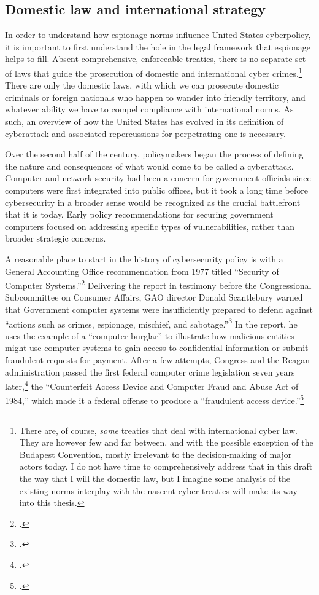 \documentclass{report}
\begin{document}
\begin{refsegment}
\subsection{Domestic law and international strategy}
In order to understand how espionage norms influence United States cyberpolicy, it is important to first understand the hole in the legal framework that espionage helps to fill. Absent comprehensive, enforceable treaties, there is no separate set of laws that guide the prosecution of domestic and international cyber crimes.\footnote{There are, of course, \emph{some} treaties that deal with international cyber law. They are however few and far between, and with the possible exception of the Budapest Convention, mostly irrelevant to the decision-making of major actors today. I do not have time to comprehensively address that in this draft the way that I will the domestic law, but I imagine some analysis of the existing norms interplay with the nascent cyber treaties will make its way into this thesis.} There are only the domestic laws, with which we can prosecute domestic criminals or foreign nationals who happen to wander into friendly territory, and whatever ability we have to compel compliance with international norms. As such, an overview of how the United States has evolved in its definition of cyberattack and associated repercussions for perpetrating one is necessary.

Over the second half of the  century, policymakers began the process of defining the nature and consequences of what would come to be called a cyberattack. Computer and network security had been a concern for government officials since computers were first integrated into public offices, but it took a long time before cybersecurity in a broader sense would be recognized as the crucial battlefront that it is today. Early policy recommendations for securing government computers focused on addressing specific types of vulnerabilities, rather than broader strategic concerns.

A reasonable place to start in the history of cybersecurity policy is with a General Accounting Office recommendation from 1977 titled ``Security of Computer Systems.''\footcite{washington_post_staff_timeline_2003} Delivering the report in testimony before the Congressional Subcommittee on Consumer Affairs, GAO director Donald Scantlebury warned that Government computer systems were insufficiently prepared to defend against ``actions such as crimes, espionage, mischief, and sabotage.''\footcite{u.s._government_accounting_office_security_1977} In the report, he uses the example of a ``computer burglar'' to illustrate how malicious entities might use computer systems to gain access to confidential information or submit fraudulent requests for payment. After a few attempts, Congress and the Reagan administration passed the first federal computer crime legislation seven years later,\footcite[This later bill, the Computer Security Act of 1987, describes the 1984 bill as being the first federal legislation in this area.]{glickman_computer_1988} the ``Counterfeit Access Device and Computer Fraud and Abuse Act of 1984,'' which made it a federal offense to produce a ``fraudulent access device.''\footcite{hughes_access_1984}


\end{refsegment}
\end{document}
